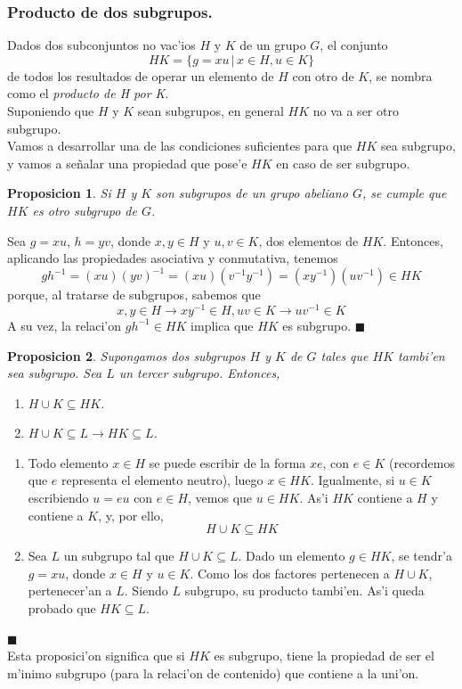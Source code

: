 \documentclass[a4paper,openright,12pt]{book}
\numberwithin{equation}{section} %
\newtheorem{proposicion}{Proposicion}[section] %
\newenvironment{proof}{\noindent{\it Demostracion:}}{\hfill$\blacksquare$} %
\begin{document}
\subsubsection{Producto de dos subgrupos.}
Dados dos subconjuntos no vac'ios $H$ y $K$ de un grupo $G$, el conjunto
\[
HK=\{ g=xu \, | \, x \in H,u\in K \}
\]
de todos los resultados de operar un elemento de $H$ con otro de $K$, se nombra como el \textit{producto de H por K}.\\
Suponiendo que $H$ y $K$ sean subgrupos, en general $HK$ no va a ser otro subgrupo.\\
Vamos a desarrollar una de las condiciones suficientes para que $HK$ sea subgrupo, y vamos a se\~nalar una propiedad que pose'e $HK$ en caso de ser subgrupo.
\begin{proposicion}
Si $H$ y $K$ son subgrupos de un grupo abeliano $G$, se cumple que $HK$ es otro subgrupo de $G$.
\end{proposicion}
\begin{proof}
Sea $g=xu$, $h=yv$, donde $x,y \in H$ y $u,v \in K$, dos elementos de $HK$. Entonces, aplicando las propiedades asociativa y conmutativa, tenemos
\[
gh^{-1}=(xu)(yv)^{-1}=(xu)(v^{-1}y^{-1})=(xy^{-1})(uv^{-1})\in HK
\]
porque, al tratarse de subgrupos, sabemos que
\[
x,y \in H \rightarrow xy^{-1}\in H,uv\in K \rightarrow uv^{-1}\in K
\]
A su vez, la relaci'on $gh^{-1}\in HK$ implica que $HK$ es subgrupo.
\end{proof}
\begin{proposicion}
Supongamos dos subgrupos $H$ y $K$ de $G$ tales que $HK$ tambi'en sea subgrupo. Sea $L$ un tercer subgrupo. Entonces,
\begin{enumerate}
\item $H \cup K \subseteq HK$.
\item $H \cup K \subseteq L \rightarrow HK \subseteq L$.
\end{enumerate}
\end{proposicion}
\begin{proof}
\begin{enumerate}
\item Todo elemento $x \in H$ se puede escribir de la forma $xe$, con $e \in K$ (recordemos que $e$ representa el elemento neutro), luego $x\in HK$. Igualmente, si $u \in K$ escribiendo $u=eu$ con $e \in H$, vemos que $u \in HK$. As'i $HK$ contiene a $H$ y contiene a $K$, y, por ello, 
\[
H \cup K \subseteq HK
\]
\item Sea $L$ un subgrupo tal que $H \cup K \subseteq L$. Dado un elemento $g \in HK$, se tendr'a $g=xu$, donde $x \in H$ y $u \in K$. Como los dos factores pertenecen a $H \cup K$, pertenecer'an a $L$. Siendo $L$ subgrupo, su producto tambi'en. As'i queda probado que $HK \subseteq L$.
\end{enumerate}
\end{proof}
\\
Esta proposici'on significa que si $HK$ es subgrupo, tiene la propiedad de ser el m'inimo subgrupo (para la relaci'on de contenido) que contiene a la uni'on.
\end{document}
